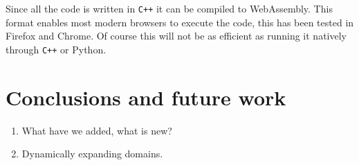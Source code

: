 
Since all the code is written in \texttt{C++} it can be compiled to WebAssembly. This format enables most modern browsers to execute the code, this has been tested in Firefox and Chrome. Of course this will not be as efficient as running it natively through \texttt{C++} or Python.

\section{Conclusions and future work}


\begin{enumerate}
    \item What have we added, what is new?
    \item Dynamically expanding domains.
\end{enumerate}

\stopchapter
